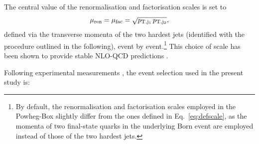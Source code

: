 \documentclass[twocolumn,epjc3]{svjour3} %
\begin{document}
    The central value of the renormalisation and factorisation scales is set to 
    \begin{equation}
    \label{eq:defscale}
     \mu_{\rm ren} = \mu_{\rm fac} = \sqrt{p_{\rm T, j_1}\, p_{\rm T, j_2}}, 
    \end{equation}
    defined via the transverse momenta of the two hardest jets (identified with the procedure outlined in the following), 
    event by event.\footnote{By default, the renormalisation and factorisation scales employed in the {\sc Powheg-Box} slightly differ from the 
        ones defined in Eq.~\eqref{eq:defscale}, as the momenta of two final-state quarks in the underlying Born event are
        employed instead of those of the two hardest jets.\label{foot:powheg}} 
    This choice of scale has been shown to provide stable NLO-QCD predictions \cite{Denner:2012dz}.

    Following experimental measurements \cite{Aad:2014zda,Aaboud:2016ffv,Khachatryan:2014sta,CMS:2017adb}, the event selection used in the present study is:
\end{document}
